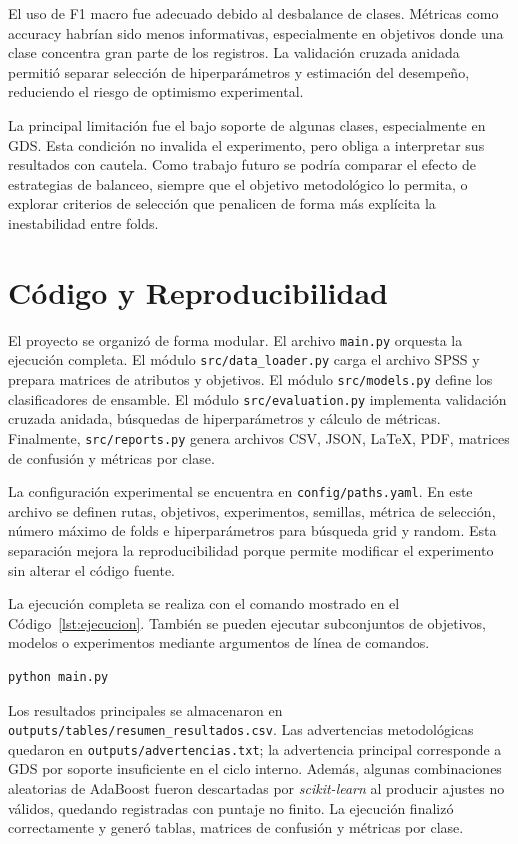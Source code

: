 \documentclass[conference]{IEEEtran}
\begin{document}
El uso de F1 macro fue adecuado debido al desbalance de clases. Métricas como accuracy habrían sido menos informativas, especialmente en objetivos donde una clase concentra gran parte de los registros. La validación cruzada anidada permitió separar selección de hiperparámetros y estimación del desempeño, reduciendo el riesgo de optimismo experimental.

La principal limitación fue el bajo soporte de algunas clases, especialmente en GDS. Esta condición no invalida el experimento, pero obliga a interpretar sus resultados con cautela. Como trabajo futuro se podría comparar el efecto de estrategias de balanceo, siempre que el objetivo metodológico lo permita, o explorar criterios de selección que penalicen de forma más explícita la inestabilidad entre folds.

\section{Código y Reproducibilidad}
El proyecto se organizó de forma modular. El archivo \texttt{main.py} orquesta la ejecución completa. El módulo \texttt{src/data\_loader.py} carga el archivo SPSS y prepara matrices de atributos y objetivos. El módulo \texttt{src/models.py} define los clasificadores de ensamble. El módulo \texttt{src/evaluation.py} implementa validación cruzada anidada, búsquedas de hiperparámetros y cálculo de métricas. Finalmente, \texttt{src/reports.py} genera archivos CSV, JSON, LaTeX, PDF, matrices de confusión y métricas por clase.

La configuración experimental se encuentra en \texttt{config/paths.yaml}. En este archivo se definen rutas, objetivos, experimentos, semillas, métrica de selección, número máximo de folds e hiperparámetros para búsqueda grid y random. Esta separación mejora la reproducibilidad porque permite modificar el experimento sin alterar el código fuente.

La ejecución completa se realiza con el comando mostrado en el Código~\ref{lst:ejecucion}. También se pueden ejecutar subconjuntos de objetivos, modelos o experimentos mediante argumentos de línea de comandos.

\begin{lstlisting}[caption={Ejecución completa del laboratorio}, label={lst:ejecucion}]
python main.py
\end{lstlisting}

Los resultados principales se almacenaron en \texttt{outputs/tables/resumen\_resultados.csv}. Las advertencias metodológicas quedaron en \texttt{outputs/advertencias.txt}; la advertencia principal corresponde a GDS por soporte insuficiente en el ciclo interno. Además, algunas combinaciones aleatorias de AdaBoost fueron descartadas por \textit{scikit-learn} al producir ajustes no válidos, quedando registradas con puntaje no finito. La ejecución finalizó correctamente y generó tablas, matrices de confusión y métricas por clase.
\end{document}
